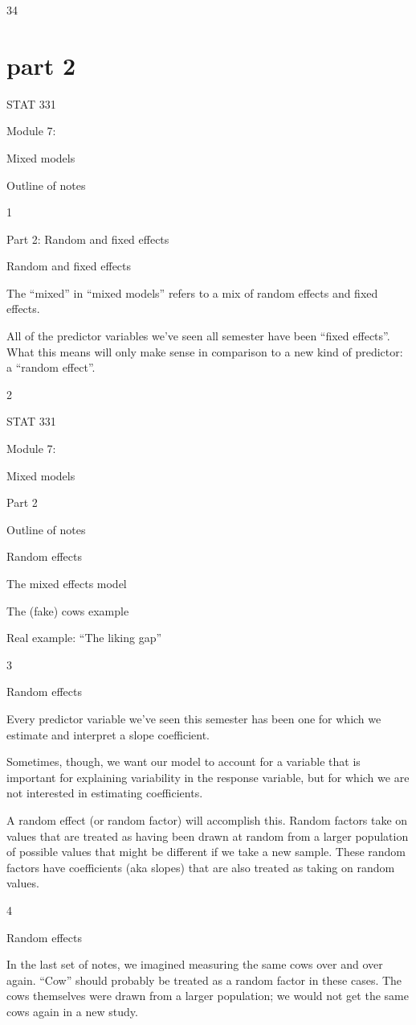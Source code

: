 \documentclass[
  letterpaper,
  DIV=11,
  numbers=noendperiod]{scrreprt}
\begin{document}
34

\hypertarget{part-2-2}{%
\section{part 2}\label{part-2-2}}

STAT 331

Module 7:

Mixed models

Outline of notes

1

Part 2: Random and fixed effects

Random and fixed effects

The ``mixed'' in ``mixed models'' refers to a mix of random effects and
fixed effects.

All of the predictor variables we've seen all semester have been ``fixed
effects''. What this means will only make sense in comparison to a new
kind of predictor: a ``random effect''.

2

STAT 331

Module 7:

Mixed models

Part 2

Outline of notes

Random effects

The mixed effects model

The (fake) cows example

Real example: ``The liking gap''

3

Random effects

Every predictor variable we've seen this semester has been one for which
we estimate and interpret a slope coefficient.

Sometimes, though, we want our model to account for a variable that is
important for explaining variability in the response variable, but for
which we are not interested in estimating coefficients.

A random effect (or random factor) will accomplish this. Random factors
take on values that are treated as having been drawn at random from a
larger population of possible values that might be different if we take
a new sample. These random factors have coefficients (aka slopes) that
are also treated as taking on random values.

4

Random effects

In the last set of notes, we imagined measuring the same cows over and
over again. ``Cow'' should probably be treated as a random factor in
these cases. The cows themselves were drawn from a larger population; we
would not get the same cows again in a new study.
\end{document}

